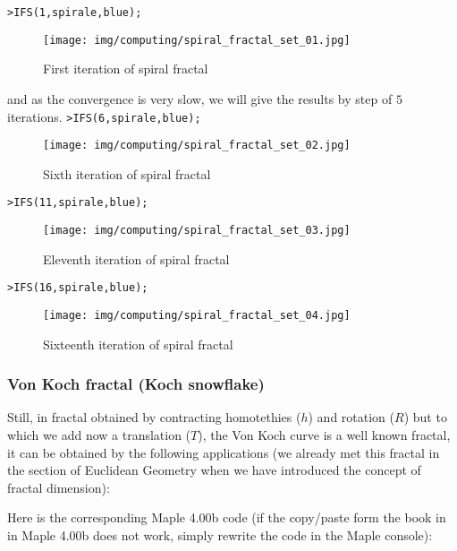  	\texttt{>IFS(1,spirale,blue);}\\
 	\begin{figure}[H]
		\centering
		\texttt{[image: img/computing/spiral\_fractal\_set\_01.jpg]}
		\caption[]{First iteration of spiral fractal}
	\end{figure}
	and as the convergence is very slow, we will give the results by step of  $5$ iterations.	
	\texttt{>IFS(6,spirale,blue);}\\
 	\begin{figure}[H]
		\centering
		\texttt{[image: img/computing/spiral\_fractal\_set\_02.jpg]}
		\caption[]{Sixth iteration of spiral fractal}
	\end{figure}
	\texttt{>IFS(11,spirale,blue);}\\
 	\begin{figure}[H]
		\centering
		\texttt{[image: img/computing/spiral\_fractal\_set\_03.jpg]}
		\caption[]{Eleventh iteration of spiral fractal}
	\end{figure}
	\texttt{>IFS(16,spirale,blue);}\\
 	\begin{figure}[H]
		\centering
		\texttt{[image: img/computing/spiral\_fractal\_set\_04.jpg]}
		\caption[]{Sixteenth iteration of spiral fractal}
	\end{figure}
	
	
	\subsubsection{Von Koch fractal (Koch snowflake)} 
	Still, in fractal obtained by contracting homotethies ($h$) and rotation ($R$) but to which we add now a translation ($T$), the Von Koch curve is a well known fractal, it can be obtained by the following applications (we already met this fractal in the section of Euclidean Geometry when we have introduced the concept of fractal dimension):	
	
	Here is the corresponding Maple 4.00b code (if the copy/paste form the book in in Maple 4.00b does not work, simply rewrite the code in the Maple console):
	
